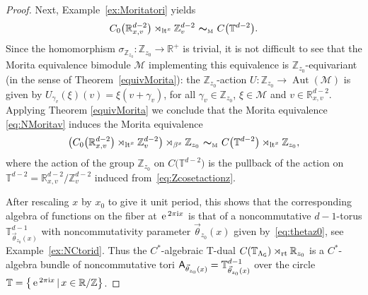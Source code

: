 \documentclass[10pt,a4paper]{amsart}
\numberwithin{equation}{section}
\newcommand{\Z}{\zed}
\newcommand{\mbf}[1]{{\boldsymbol {#1} }}
\def\ii{{{\rm i}}}
\def\A{{\sf A}}
\newcommand{\sfG}{\mathsf{G}}
\newcommand{\Aut}{\operatorname{Aut}}
\newcommand{\lt}{{\rm lt}}
\newcommand{\rt}{{\rm rt}}
\newcommand{\zed}{{\mathbb Z}} %
\newcommand{\real}{{\mathbb R}} %
\newcommand{\torus}{{\mathbb T}} %
\def\Mcal{{\mathcal M}}
\def\e{{\,\rm e}\,}
\begin{document}
\begin{proof}
Next, Example~\ref{ex:Moritatori} yields
\begin{gather}\label{eq:NMoritav}
C_0\big(\real_{x,v}^{d-2}\big)\rtimes_{\lt^x} \Z_{v}^{d-2} \ \mbf\sim_{\text{\tiny M}} \
C\big(\torus^{d-2}\big) .
\end{gather}
Since the homomorphism
$\sigma_{\Z_{ z_0}}\colon \Z_{ z_0}\to\real^+$ is trivial, it is not difficult to see
that the Morita equivalence bimodule $\Mcal$ implementing this
equivalence is $\Z_{ z_0}$-equivariant (in the sense of Theorem~\ref{equivMorita}):
the $\Z_{ z_0}$-action
$U\colon \Z_{ z_0}\rightarrow \Aut(\Mcal)$ is given by $U_{\gamma_v}(\xi)(v)=\xi(v+\gamma_v)$, for all $\gamma_v\in
\Z_{ z_0}$, $\xi\in \Mcal$ and $v\in \real_{x,v}^{d-2} $.
Applying Theorem \ref{equivMorita} we conclude that the
Morita equivalence \eqref{eq:NMoritav} induces the Morita equivalence
\begin{gather}\label{eq:fibreNCMostow}
\big(C_0\big(\real^{d-2}_{x,v}\big)\rtimes_{\lt^x}\Z^{d-2}_{v}\big) \rtimes_{\beta^x}
\Z_{ z_0} \ \mbf\sim_{\text{\tiny M}} \
C\big(\torus^{d-2}\big)\rtimes_{\lt^x}\Z_{ z_0} ,
\end{gather}
where the action
of the group $\Z_{ z_0}$ on $C\big(\torus^{d-2}\big)$ is the pullback of the action on
$\torus^{d-2}=\real_{x,v}^{d-2}/\Z_{v}^{d-2}$ induced
from~\eqref{eq:Zcosetactionz}.

After rescaling $x$ by $x_0$
to give it unit period, this shows that the
corresponding algebra of functions on the fiber at $\e^{2\pi\ii x}$ is that
of a noncommutative $d{-}1$-torus $\torus_{\vec\theta_{
 z_0}(x)}^{d-1}$ with noncommutativity parameter
$\vec\theta_{z_0}(x)$ given by~\eqref{eq:thetaz0}, see Example~\ref{ex:NCtorid}.
Thus the $C^*$-algebraic T-dual
$C(\torus_{\Lambda_\sfG})\rtimes_\rt\real_{ z_0}$ is a $C^*$-algebra bundle
of noncommutative tori $\A_{\vec\theta_{
 z_0}(x)}=\torus^{d-1}_{\vec\theta_{ z_0}(x)}$ over the
circle $\torus=\big\{\e^{2\pi\ii x}\, | \, x\in \real/\Z\big\}$.
\end{proof}
\end{document}
